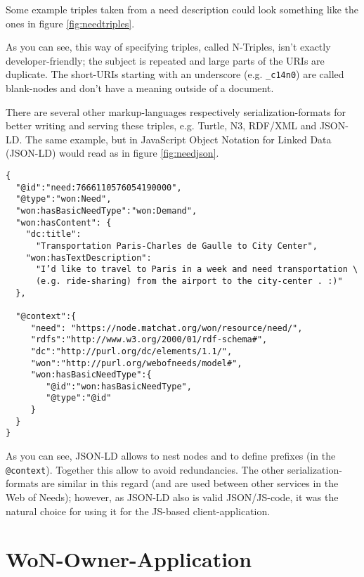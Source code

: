 Some example triples taken from a need description could look something
like the ones in figure \ref{fig:needtriples}.

As you can see, this way of specifying triples, called N-Triples, isn't
exactly developer-friendly; the subject is repeated and large parts of
the URIs are duplicate. The short-URIs starting with an underscore (e.g.
\texttt{\_c14n0}) are called blank-nodes and don't have a meaning
outside of a document.

There are several other mark\-up-lan\-gua\-ges res\-pec\-tively se\-ria\-li\-za\-tion-formats
for bett\-er wri\-ting and ser\-ving these tri\-ples, e.g. Tur\-tle, N3, RDF/XML and
JSON-LD. The same ex\-ample, but in Java\-Script Object No\-ta\-tion for Linked Data
(JSON-LD) would read as in figure \ref{fig:needjson}.

\begin{figure*}
\centering
\begin{verbatim}
{
  "@id":"need:7666110576054190000",
  "@type":"won:Need",
  "won:hasBasicNeedType":"won:Demand",
  "won:hasContent": {
    "dc:title":
      "Transportation Paris-Charles de Gaulle to City Center",
    "won:hasTextDescription":
      "I’d like to travel to Paris in a week and need transportation \
      (e.g. ride-sharing) from the airport to the city-center . :)"
  },

  "@context":{
     "need": "https://node.matchat.org/won/resource/need/",
     "rdfs":"http://www.w3.org/2000/01/rdf-schema#",
     "dc":"http://purl.org/dc/elements/1.1/",
     "won":"http://purl.org/webofneeds/model#",
     "won:hasBasicNeedType":{
        "@id":"won:hasBasicNeedType",
        "@type":"@id"
     }
  }
}
\end{verbatim}
\caption{Excerpt of a need description (JSON-LD)}
\label{fig:needjson}
\end{figure*}

As you can see, JSON-LD allows to nest nodes and to define prefixes (in
the \texttt{@context}). Together this allow to avoid redundancies. The
other serialization-formats are similar in this regard (and are used
between other services in the Web of Needs); however, as JSON-LD also is
valid JSON/JS-code, it was the natural choice for using it for the
JS-based client-application.

\section{WoN-Owner-Application}\label{won-owner-application}


